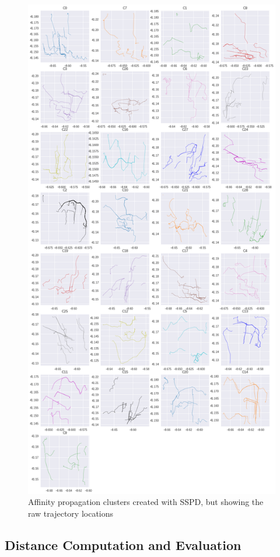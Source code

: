 \begin{figure}[h]
  \centering
  \includegraphics[width=.9\linewidth,height=.9\textheight,keepaspectratio]{figs/clusters/CLU_AP_ALL[SSPD]_REAL.png}
  \caption{Affinity propagation clusters created with SSPD, but showing the raw trajectory locations}
  \label{fig:sspd_loc_real}
\end{figure}


\subsection{Distance Computation and Evaluation}

